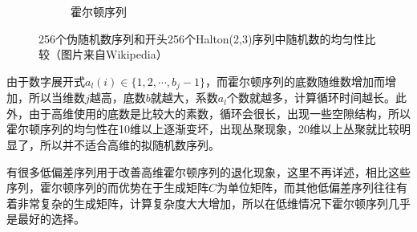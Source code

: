 \begin{figure}
{\begin{subfigure}[b]{0.32\textwidth}
		\caption{霍尔顿序列}
	\end{subfigure}}
	\caption{256个伪随机数序列和开头256个Halton(2,3)序列中随机数的均匀性比较（图片来自Wikipedia） }
	\label{f:mc-halton}
\end{figure}

由于数字展开式$a_l(i)\in \{1,2,\cdots,b_j-1 \}$，而霍尔顿序列的底数随维数增加而增加，所以当维数$j$越高，底数$b$就越大，系数$a_l$个数就越多，计算循环时间越长。此外，由于高维使用的底数是比较大的素数，循环会很长，出现一些空隙结构，所以霍尔顿序列的均匀性在10维以上逐渐变坏，出现丛聚现象，20维以上丛聚就比较明显了，所以并不适合高维的拟随机数序列。

有很多低偏差序列用于改善高维霍尔顿序列的退化现象，这里不再详述，相比这些序列，霍尔顿序列的而优势在于生成矩阵$C$为单位矩阵，而其他低偏差序列往往有着非常复杂的生成矩阵，计算复杂度大大增加，所以在低维情况下霍尔顿序列几乎是最好的选择。
